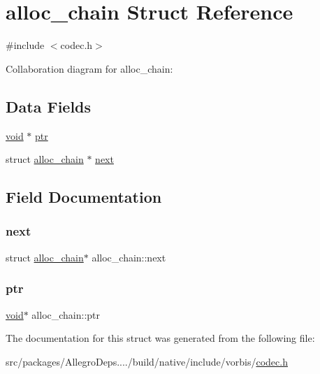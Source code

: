 \hypertarget{structalloc__chain}{}\section{alloc\+\_\+chain Struct Reference}
\label{structalloc__chain}


{\ttfamily \#include $<$codec.\+h$>$}



Collaboration diagram for alloc\+\_\+chain\+:
\subsection*{Data Fields}
\begin{DoxyCompactItemize}
\item 
\hyperlink{png_8h_ac9c84fa68bbad002983e35ce3663c686}{void} $\ast$ \hyperlink{structalloc__chain_a564538413768f266bd5bda09d892e99d}{ptr}
\item 
struct \hyperlink{structalloc__chain}{alloc\+\_\+chain} $\ast$ \hyperlink{structalloc__chain_a596f6605e59080015c3c6dfd07326c83}{next}
\end{DoxyCompactItemize}


\subsection{Field Documentation}
\mbox{\label{structalloc__chain_a596f6605e59080015c3c6dfd07326c83}} 
\subsubsection{\texorpdfstring{next}{next}}
{\footnotesize\ttfamily struct \hyperlink{structalloc__chain}{alloc\+\_\+chain}$\ast$ alloc\+\_\+chain\+::next}

\mbox{\label{structalloc__chain_a564538413768f266bd5bda09d892e99d}} 
\subsubsection{\texorpdfstring{ptr}{ptr}}
{\footnotesize\ttfamily \hyperlink{png_8h_ac9c84fa68bbad002983e35ce3663c686}{void}$\ast$ alloc\+\_\+chain\+::ptr}



The documentation for this struct was generated from the following file\+:\begin{DoxyCompactItemize}
\item 
src/packages/\+Allegro\+Deps..../build/native/include/vorbis/\hyperlink{vorbis_2codec_8h}{codec.\+h}\end{DoxyCompactItemize}
